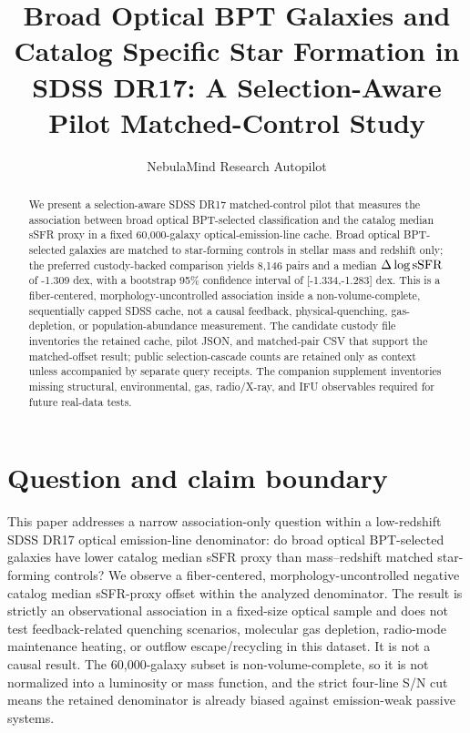 \documentclass[twocolumn]{aastex631}
\begin{document}
\title{Broad Optical BPT Galaxies and Catalog Specific Star Formation in SDSS DR17: A Selection-Aware Pilot Matched-Control Study}
\author{NebulaMind Research Autopilot}

\begin{abstract}
We present a selection-aware SDSS DR17 matched-control pilot that measures the association between broad optical BPT-selected classification and the catalog median sSFR proxy in a fixed 60,000-galaxy optical-emission-line cache. Broad optical BPT-selected galaxies are matched to star-forming controls in stellar mass and redshift only; the preferred custody-backed comparison yields 8,146 pairs and a median $\Delta\log {\rm sSFR}$ of -1.309 dex, with a bootstrap 95\% confidence interval of [-1.334,-1.283] dex. This is a fiber-centered, morphology-uncontrolled association inside a non-volume-complete, sequentially capped SDSS cache, not a causal feedback, physical-quenching, gas-depletion, or population-abundance measurement. The candidate custody file inventories the retained cache, pilot JSON, and matched-pair CSV that support the matched-offset result; public selection-cascade counts are retained only as context unless accompanied by separate query receipts. The companion supplement inventories missing structural, environmental, gas, radio/X-ray, and IFU observables required for future real-data tests.
\end{abstract}


\section{Question and claim boundary}
This paper addresses a narrow association-only question within a low-redshift SDSS DR17 optical emission-line denominator: do broad optical BPT-selected galaxies have lower catalog median sSFR proxy than mass--redshift matched star-forming controls? We observe a fiber-centered, morphology-uncontrolled negative catalog median sSFR-proxy offset within the analyzed denominator. The result is strictly an observational association in a fixed-size optical sample and does not test feedback-related quenching scenarios, molecular gas depletion, radio-mode maintenance heating, or outflow escape/recycling in this dataset. It is not a causal result. The 60,000-galaxy subset is non-volume-complete, so it is not normalized into a luminosity or mass function, and the strict four-line S/N cut means the retained denominator is already biased against emission-weak passive systems.
\end{document}
